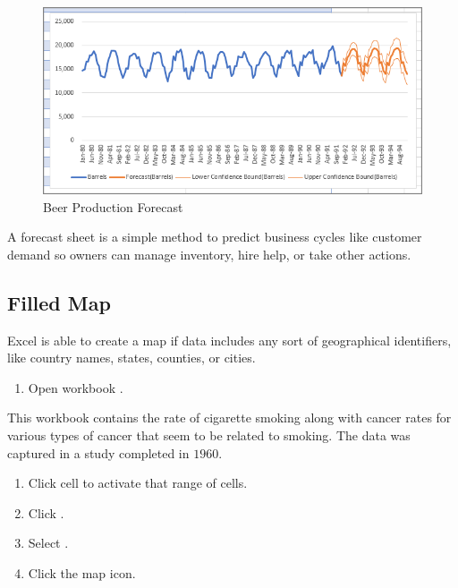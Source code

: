 \begin{figure}[H]
	\centering
	\includegraphics[width=\maxwidth{.95\linewidth}]{gfx/ch08_fig14}
	\caption{Beer Production Forecast}
	\label{08:fig14}
\end{figure}

A forecast sheet is a simple method to predict business cycles like customer demand so owners can manage inventory, hire help, or take other actions.

\subsection{Filled Map}

Excel is able to create a map if data includes any sort of geographical identifiers, like country names, states, counties, or cities. 

\begin{enumerate}
	\item Open workbook .
\end{enumerate}

This workbook contains the rate of cigarette smoking along with cancer rates for various types of cancer that seem to be related to smoking. The data was captured in a study completed in $ 1960 $.

\begin{enumerate}[resume]
	\item Click cell  to activate that range of cells.
	\item Click .
	\item Select .
	\item Click the map icon.
\end{enumerate}

